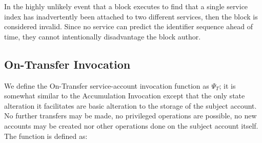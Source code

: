 \nb In the highly unlikely event that a block executes to find that a single service index has inadvertently been attached to two different services, then the block is considered invalid. Since no service can predict the identifier sequence ahead of time, they cannot intentionally disadvantage the block author.

\subsection{On-Transfer Invocation}\label{sec:ontransferinvocation}

We define the On-Transfer service-account invocation function as $\Psi_T$; it is somewhat similar to the Accumulation Invocation except that the only state alteration it facilitates are basic alteration to the storage of the subject account. No further transfers may be made, no privileged operations are possible, no new accounts may be created nor other operations done on the subject account itself. The function is defined as:
